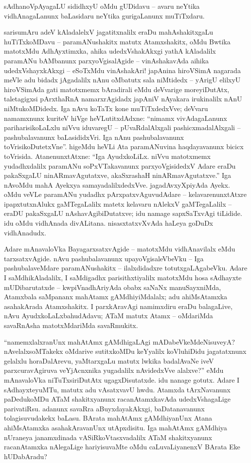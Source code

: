 sAdhanoVpAyagaLU sididhxyU oMdu gUDidavu -- avaru neYtika vidhAna\-gaLanunx baLasidaru neYtika gurigaLanunx muTiTxdaru.

sarisumAru adeV kAladalelxV jagatitxnalilx eraDu mahAshakitxgaLu huTiTxkoMDavu -- paramANushakitx matutx Atamxshakitx, oMdu Bwtika matotxMdu AdhAyxtimxka, ahika udedxVshakAkxgi yathA kAladalilx paramANu bAMbanunx parxyoVgisalAgide -- vinAshakavAda aihika udedxVshayxkAkxgi -- eSoTxMdu vinAshakAri! japAnina hiroVSimA nagarada meVle adu bidadx jAgadalilx nAnu oMbatutx sala niMtidedx -- yArigU elilxyU hiroVSimAda gati matotxmemx bAradirali eMdu deVvarige moreyiDutAtx, taletagigxsi pArxthaRnA namarxrAgidadx japAniV nAyakara irukinalilx nAnU niMtukoMDidedx. Iga nAvu koTaTx kone muTiTxdedxVve; deVvaru namamxnunx kuriteV hiVge heVLutitxdAdxne: ``nimamx vivAdagaLanunx pariharisikoLaLxlu niVvu iduvaregU -- pUvaRdalAlxgali pashicxmadalAlxgali -- pashubalavanunx baLasididxVri. Iga nAnu pashubalavanunx toVrisikoDutetxVne''. higeMdu heVLi Ata paramANuvina haqdayavanunx bicicx toVrisida. AtanenunxtAtxne: ``Iga AyudxkoLiLx. niVvu matotxmemx yudadhxdalilx paramANu soPxVTakavanunx parxyoVgisidedxV Adare eraDu pakaSxgaLU ninARmavAgutatxve, akaSxrashaH ninARmavAgutatxve.'' Iga nAvoMdu mahA Ayekxya samayadalilxdedxVve. jagadAvxyXpiyAda Ayekx. oMdu veVLe paramANu yudadhx pArxpatxvAguvudAdare -- kelavarenunxtAtxre ipapxtutxnAlukx gaMTegaLalilx matetx kelavaru nAlekxV gaMTegaLalilx -- eraDU pakaSxgaLU nAshavAgibiDutatxve; idu namage sapxSaTxvAgi tiLidide. idu oMdu vidhAnada divALitana. nisasxtatxvXvAda haLeya goDuDx vidhAnadudx.

Adare mAnavaloVka BayagarxsatxvAgide -- matotxMdu vidhAnavilalx eMdu tarxsatxvAgide. nAvu pashubalavanunx upayoVgisaleVbeVku -- Iga pashubalaveMdare paramANushakitx -- ilalxdidadxre totutxgaLAgabeVku. Adare I saMdhikAladalilx, I saMdigadhx parisithxtiyalilx matotxMdu hosa sAdhayxte mUDibarutatxde -- kwpiVnadhAriyAda obabx saNaNx manuSayxniMda, Atamxbala saMpananx mahAtamx gAMdhiyiMdalalx; adu ahiMsAtamxka asahakArada Atamxshakitx. I parxkAravAgi namimxdiru eraDu balagaLive, nAvu AyudxkoLaLxbahudAdavu; ATaM matutx Atamx -- oMdariMda savaRnAsha matotxMdariMda savaRmukitx.

``namemxlalxranUnx mahAtAmx gAMdhigaLAgi mADabeVkeMdeNisuveyA? nAvelalx\break soMTakekx oMdarive sutitxkoMDu keYyalilx koVluhiDidu jagatatxnunx gelalxlu horaDa\-lArevu, yaMtarxgaLu matutx lwkika badalAvaNe iveV parxcuravAgiruva veYjAcnxnika yugadalilx nAvidedxVve alalxve?'' eMdu mAnavaloVka niTuTxsiriDutAtx ugagxDisutatxde. idu nanage gotutx. Adare I sAdhayxteyuMTu, matutx adu vAsatxvavU hwdu. Atamxda tArxNavanunx paDedukoMDu ATaM shakitxyanunx racanAtamxkavAda udedxVshagaLige parivatiRsu. adanunx savaRra aBuyxdayakAkxgi, baDatanavanunx tolagisuvudakekx baLasu. BArata mahAtAmx gAMdhiyanUnx Atana ahiMsAtamxka asahakAravanUnx utApxdisitu. Iga mahAtAmx gAMdhiya nUraneya janamxdinada vASiRkoVtasxvadalilx ATaM shakitxyanunx racanAtamxka nAlegaLige hariyisuvaMte oMdu caLuvaLiyanenxV BArata Eke hUDabAradu?

